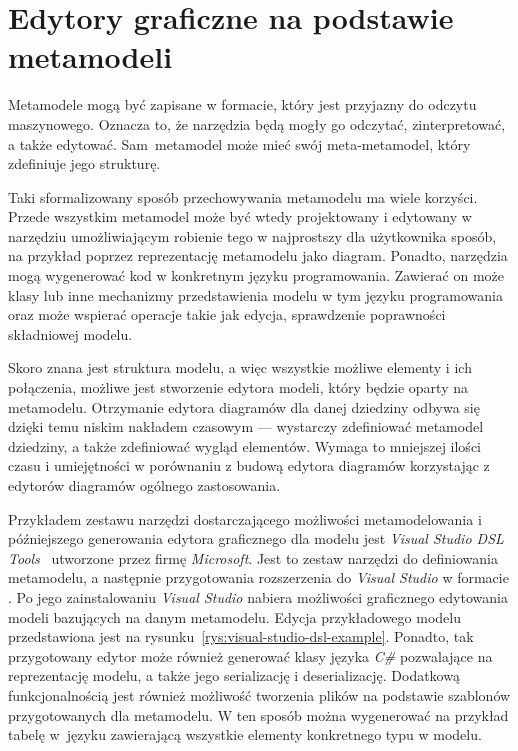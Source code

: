 \section{Edytory graficzne na podstawie metamodeli}

Metamodele mogą być zapisane w formacie, który jest przyjazny do odczytu
maszynowego. Oznacza to, że narzędzia będą mogły go odczytać, zinterpretować, a
także edytować. Sam~metamodel może mieć swój meta-metamodel, który zdefiniuje
jego strukturę.

Taki sformalizowany sposób przechowywania metamodelu ma wiele
korzyści. Przede wszystkim metamodel może być wtedy projektowany i edytowany w
narzędziu umożliwiającym robienie tego w najprostszy dla użytkownika sposób, na
przykład poprzez reprezentację metamodelu jako diagram. Ponadto, narzędzia mogą
wygenerować kod w konkretnym języku programowania. Zawierać on może klasy lub
inne mechanizmy przedstawienia modelu w tym języku programowania oraz może
wspierać operacje takie jak edycja, sprawdzenie poprawności składniowej
modelu.

Skoro znana jest struktura modelu, a więc wszystkie możliwe elementy i ich
połączenia, możliwe jest stworzenie edytora modeli, który będzie oparty na
metamodelu. Otrzymanie edytora diagramów dla danej dziedziny odbywa się dzięki
temu niskim nakładem czasowym --- wystarczy zdefiniować metamodel dziedziny, a
także zdefiniować wygląd elementów. Wymaga to mniejszej ilości czasu i
umiejętności w porównaniu z budową edytora diagramów korzystając z
edytorów diagramów ogólnego zastosowania.

Przykładem zestawu narzędzi dostarczającego możliwości metamodelowania i
późniejszego generowania edytora graficznego dla modelu jest \emph{Visual
	Studio DSL Tools}~\cite{visual-studio-dsl-introduction} utworzone przez
firmę \emph{Microsoft}. Jest to zestaw
narzędzi do definiowania metamodelu, a następnie przygotowania rozszerzenia do
\emph{Visual Studio} w formacie . Po jego zainstalowaniu
\emph{Visual Studio} nabiera możliwości graficznego edytowania modeli
bazujących na danym metamodelu. Edycja przykładowego modelu przedstawiona jest
na rysunku~\ref{rys:visual-studio-dsl-example}. Ponadto, tak przygotowany
edytor
może również generować klasy języka \emph{C\#} pozwalające na reprezentację
modelu, a
także jego serializację i deserializację. Dodatkową funkcjonalnością jest
również możliwość tworzenia plików na podstawie szablonów przygotowanych dla
metamodelu. W ten sposób można wygenerować na przykład tabelę w~języku
 zawierającą wszystkie elementy konkretnego typu w modelu.

